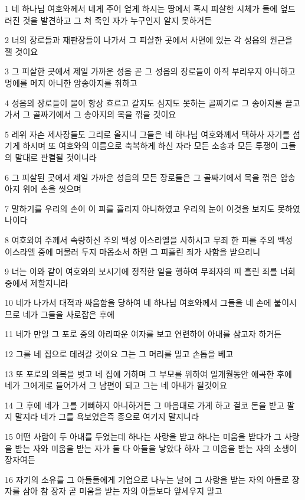 \par 1 네 하나님 여호와께서 네게 주어 얻게 하시는 땅에서 혹시 피살한 시체가 들에 엎드러진 것을 발견하고 그 쳐 죽인 자가 누구인지 알지 못하거든
\par 2 너의 장로들과 재판장들이 나가서 그 피살한 곳에서 사면에 있는 각 성읍의 원근을 잴 것이요
\par 3 그 피살한 곳에서 제일 가까운 성읍 곧 그 성읍의 장로들이 아직 부리우지 아니하고 멍에를 메지 아니한 암송아지를 취하고
\par 4 성읍의 장로들이 물이 항상 흐르고 갈지도 심지도 못하는 골짜기로 그 송아지를 끌고 가서 그 골짜기에서 그 송아지의 목을 꺾을 것이요
\par 5 레위 자손 제사장들도 그리로 올지니 그들은 네 하나님 여호와께서 택하사 자기를 섬기게 하시며 또 여호와의 이름으로 축복하게 하신 자라 모든 소송과 모든 투쟁이 그들의 말대로 판켤될 것이니라
\par 6 그 피살된 곳에서 제일 가까운 성읍의 모든 장로들은 그 골짜기에서 목을 꺾은 암송아지 위에 손을 씻으며
\par 7 말하기를 우리의 손이 이 피를 흘리지 아니하였고 우리의 눈이 이것을 보지도 못하였나이다
\par 8 여호와여 주께서 속량하신 주의 백성 이스라엘을 사하시고 무죄 한 피를 주의 백성 이스라엘 중에 머물러 두지 마옵소서 하면 그 피흘린 죄가 사함을 받으리니
\par 9 너는 이와 같이 여호와의 보시기에 정직한 일을 행하여 무죄자의 피 흘린 죄를 너희 중에서 제할지니라
\par 10 네가 나가서 대적과 싸움함을 당하여 네 하나님 여호와께서 그들을 네 손에 붙이시므로 네가 그들을 사로잡은 후에
\par 11 네가 만일 그 포로 중의 아리따운 여자를 보고 연련하여 아내를 삼고자 하거든
\par 12 그를 네 집으로 데려갈 것이요 그는 그 머리를 밀고 손톱을 베고
\par 13 또 포로의 의복을 벗고 네 집에 거하며 그 부모를 위하여 일개월동안 애곡한 후에 네가 그에게로 들어가서 그 남편이 되고 그는 네 아내가 될것이요
\par 14 그 후에 네가 그를 기뻐하지 아니하거든 그 마음대로 가게 하고 결코 돈을 받고 팔지 말지라 네가 그를 욕보였은즉 종으로 여기지 말지니라
\par 15 어떤 사람이 두 아내를 두었는데 하나는 사랑을 받고 하나는 미움을 받다가 그 사랑을 받는 자와 미움을 받는 자가 둘 다 아들을 낳았다 하자 그 미움을 받는 자의 소생이 장자여든
\par 16 자기의 소유를 그 아들들에게 기업으로 나누는 날에 그 사랑을 받는 자의 아들로 장자를 삼아 참 장자 곧 미움을 받는 자의 아들보다 앞세우지 말고
